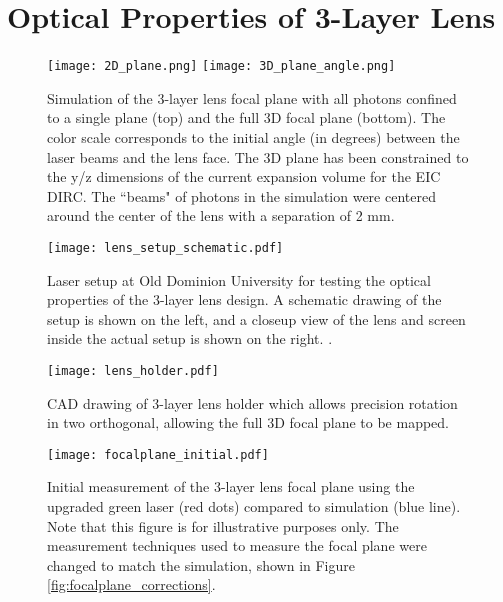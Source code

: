 \section{Optical Properties of 3-Layer Lens}
\begin{figure}[!htb]
	\centering
	\texttt{[image: 2D\_plane.png]}
	\texttt{[image: 3D\_plane\_angle.png]}
	\caption[Simulation of the 3-layer lens focal plane with all photons confined to a single plane (top) and the full 3D focal plane (bottom).]{Simulation of the 3-layer lens focal plane with all photons confined to a single plane (top) and the full 3D focal plane (bottom). The color scale corresponds to the initial angle (in degrees) between the laser beams and the lens face. The 3D plane has been constrained to the y/z dimensions of the current expansion volume for the EIC DIRC. The ``beams" of photons in the simulation were centered around the center of the lens with a separation of 2 mm.}
	\label{fig:focalplane_sim}
\end{figure}
\begin{figure}[!htb]
	\centering
	\texttt{[image: lens\_setup\_schematic.pdf]}
	\caption[Laser setup at Old Dominion University for testing the optical properties of the 3-layer lens design.]{Laser setup at Old Dominion University for testing the optical properties of the 3-layer lens design. A schematic drawing of the setup is shown on the left, and a closeup view of the lens and screen inside the actual setup is shown on the right. \cite{myICHEP2016}.}
	\label{fig:ODU_setup}
\end{figure}

\begin{figure}[!htb]
	\centering
	\texttt{[image: lens\_holder.pdf]}
	\caption{CAD drawing of 3-layer lens holder which allows precision rotation in two orthogonal, allowing the full 3D focal plane to be mapped.}
	\label{fig:lens_holder}
\end{figure}

\begin{figure}[!htb]
	\centering
	\texttt{[image: focalplane\_initial.pdf]}
	\caption[Initial measurement of the 3-layer lens focal plane using the upgraded green laser (red dots) compared to simulation (blue line).]{Initial measurement of the 3-layer lens focal plane using the upgraded green laser (red dots) compared to simulation (blue line). Note that this figure is for illustrative purposes only. The measurement techniques used to measure the focal plane were changed to match the simulation, shown in Figure \ref{fig:focalplane_corrections}.}
	\label{fig:focalplane_initial}
\end{figure}

